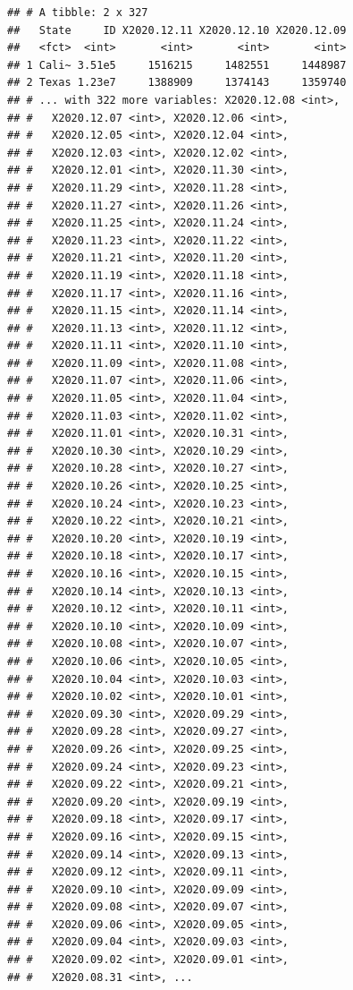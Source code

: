 \documentclass[]{book}
\begin{document}
\begin{verbatim}
## # A tibble: 2 x 327
##   State     ID X2020.12.11 X2020.12.10 X2020.12.09
##   <fct>  <int>       <int>       <int>       <int>
## 1 Cali~ 3.51e5     1516215     1482551     1448987
## 2 Texas 1.23e7     1388909     1374143     1359740
## # ... with 322 more variables: X2020.12.08 <int>,
## #   X2020.12.07 <int>, X2020.12.06 <int>,
## #   X2020.12.05 <int>, X2020.12.04 <int>,
## #   X2020.12.03 <int>, X2020.12.02 <int>,
## #   X2020.12.01 <int>, X2020.11.30 <int>,
## #   X2020.11.29 <int>, X2020.11.28 <int>,
## #   X2020.11.27 <int>, X2020.11.26 <int>,
## #   X2020.11.25 <int>, X2020.11.24 <int>,
## #   X2020.11.23 <int>, X2020.11.22 <int>,
## #   X2020.11.21 <int>, X2020.11.20 <int>,
## #   X2020.11.19 <int>, X2020.11.18 <int>,
## #   X2020.11.17 <int>, X2020.11.16 <int>,
## #   X2020.11.15 <int>, X2020.11.14 <int>,
## #   X2020.11.13 <int>, X2020.11.12 <int>,
## #   X2020.11.11 <int>, X2020.11.10 <int>,
## #   X2020.11.09 <int>, X2020.11.08 <int>,
## #   X2020.11.07 <int>, X2020.11.06 <int>,
## #   X2020.11.05 <int>, X2020.11.04 <int>,
## #   X2020.11.03 <int>, X2020.11.02 <int>,
## #   X2020.11.01 <int>, X2020.10.31 <int>,
## #   X2020.10.30 <int>, X2020.10.29 <int>,
## #   X2020.10.28 <int>, X2020.10.27 <int>,
## #   X2020.10.26 <int>, X2020.10.25 <int>,
## #   X2020.10.24 <int>, X2020.10.23 <int>,
## #   X2020.10.22 <int>, X2020.10.21 <int>,
## #   X2020.10.20 <int>, X2020.10.19 <int>,
## #   X2020.10.18 <int>, X2020.10.17 <int>,
## #   X2020.10.16 <int>, X2020.10.15 <int>,
## #   X2020.10.14 <int>, X2020.10.13 <int>,
## #   X2020.10.12 <int>, X2020.10.11 <int>,
## #   X2020.10.10 <int>, X2020.10.09 <int>,
## #   X2020.10.08 <int>, X2020.10.07 <int>,
## #   X2020.10.06 <int>, X2020.10.05 <int>,
## #   X2020.10.04 <int>, X2020.10.03 <int>,
## #   X2020.10.02 <int>, X2020.10.01 <int>,
## #   X2020.09.30 <int>, X2020.09.29 <int>,
## #   X2020.09.28 <int>, X2020.09.27 <int>,
## #   X2020.09.26 <int>, X2020.09.25 <int>,
## #   X2020.09.24 <int>, X2020.09.23 <int>,
## #   X2020.09.22 <int>, X2020.09.21 <int>,
## #   X2020.09.20 <int>, X2020.09.19 <int>,
## #   X2020.09.18 <int>, X2020.09.17 <int>,
## #   X2020.09.16 <int>, X2020.09.15 <int>,
## #   X2020.09.14 <int>, X2020.09.13 <int>,
## #   X2020.09.12 <int>, X2020.09.11 <int>,
## #   X2020.09.10 <int>, X2020.09.09 <int>,
## #   X2020.09.08 <int>, X2020.09.07 <int>,
## #   X2020.09.06 <int>, X2020.09.05 <int>,
## #   X2020.09.04 <int>, X2020.09.03 <int>,
## #   X2020.09.02 <int>, X2020.09.01 <int>,
## #   X2020.08.31 <int>, ...
\end{verbatim}
\end{document}

